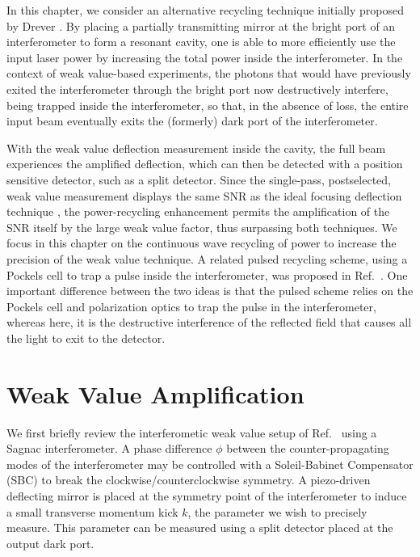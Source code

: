 In this chapter, we consider an alternative recycling technique initially proposed by Drever \cite{Drever1983}.  By placing a partially transmitting mirror at the bright port of an interferometer to form a resonant cavity, one is able to more efficiently use the input laser power by increasing the total power inside the interferometer.  In the context of weak value-based experiments, the photons that would have previously exited the interferometer through the bright port now destructively interfere, being trapped inside the interferometer, so that, in the absence of loss, the entire input beam eventually exits the (formerly) dark port of the interferometer.

With the weak value deflection measurement inside the cavity, the full beam experiences the amplified deflection, which can then be detected with a position sensitive detector, such as a split detector.  Since the single-pass, postselected, weak value measurement displays the same SNR as the ideal focusing deflection technique \cite{Starling2010,Jordan2014,Viza2014}, the power-recycling enhancement permits the amplification of the SNR itself by the large weak value factor, thus surpassing both techniques.  We focus in this chapter on the continuous wave recycling of power to increase the precision of the weak value technique. A related pulsed recycling scheme, using a Pockels cell to trap a pulse inside the interferometer, was proposed in Ref.~\cite{Dressel2013}.  One important difference between the two ideas is that the pulsed scheme relies on the Pockels cell and polarization optics to trap the pulse in the interferometer, whereas here, it is the destructive interference of the reflected field that causes all the light to exit to the detector.



\section{Weak Value Amplification}
We first briefly review the interferometic weak value setup of Ref.~\cite{Dixon2009} using a Sagnac interferometer.  A phase difference $\phi$ between the counter-propagating modes of the interferometer may be controlled with a Soleil-Babinet Compensator (SBC) to break the clockwise/counterclockwise symmetry. A piezo-driven deflecting mirror is placed at the symmetry point of the interferometer to induce a small transverse momentum kick $k$, the parameter we wish to precisely measure. This parameter can be measured using a split detector placed at the output dark port.  

